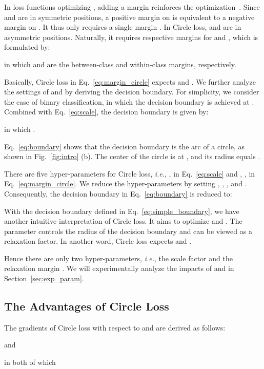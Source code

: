 \documentclass[10pt,twocolumn,letterpaper]{article}
\begin{document}
In loss functions optimizing , adding a margin  reinforces the optimization~\cite{liu2017sphereface,Liu2016LargeMarginSL,wang2018additive,Wang_2018_CVPR}. Since  and  are in symmetric positions, a positive margin on  is equivalent to  a negative margin on . It thus only requires a single margin . In Circle loss,  and  are in asymmetric positions. Naturally, it requires respective margins for  and , which is formulated by:

\begin{scriptsize}
 
\end{scriptsize}
in which  and  are the between-class and within-class margins, respectively. 

Basically, Circle loss in Eq.~\ref{eq:margin_circle} expects  and . We further analyze the settings of  and  by deriving the decision boundary. For simplicity, we consider the case of binary classification, in which the decision boundary is achieved at . 
Combined with Eq.~\ref{eq:scale}, the decision boundary is given by:

in which .

Eq.~\ref{eq:boundary} shows that the decision boundary is the arc of a circle, as shown in Fig.~\ref{fig:intro} (b). The center of the circle is at , and its radius equals . 



There are five hyper-parameters for Circle loss, \emph{i.e.}, ,  in Eq.~\ref{eq:scale} and , ,  in Eq.~\ref{eq:margin_circle}. We reduce the hyper-parameters by setting , , , and . 
Consequently, the decision boundary in Eq.~\ref{eq:boundary} is reduced to:



With the decision boundary defined in Eq.~\ref{eq:simple_boundary}, we have another intuitive interpretation of Circle loss. It aims to optimize  and . The parameter  controls the radius of the decision boundary and can be viewed as a relaxation factor. In another word, Circle loss expects  and .

Hence there are only two hyper-parameters, \emph{i.e.}, the scale factor  and the relaxation margin .
We will experimentally analyze the impacts of  and  in Section~\ref{sec:exp_param}.




\subsection{The Advantages of Circle Loss}\label{sec:method_character}
{The gradients} of Circle loss with respect to  and  are derived as follows:
\begin{small}

\end{small}
and
\begin{small}

\end{small}
in both of which
\end{document}
